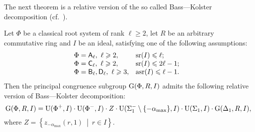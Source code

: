 The next theorem is a relative version of the so called Bass---Kolster decomposition (cf.~\cite[Theorem~2.1]{St78}).
\begin{thm}\label{thm:BassKolster}
Let $\Phi$ be a classical root system of rank $\ell\geqslant2$, let $R$ be an arbitrary commutative ring and $I$ be an ideal, satisfying one of the following assumptions:
\[\begin{array}{l@{\quad}l@{\quad}l@{\quad}c}
\Phi = \rA_\ell,\ \ell\geqslant 2, & \sr(I) \leqslant \ell; \\
\Phi = \rC_\ell,\ \ell\geqslant 2, & \sr(I) \leqslant 2\ell-1; \\
\Phi = \rB_\ell, \rD_\ell,\ \ell\geqslant 3, & \asr(I) \leqslant \ell-1.
\end{array}\]
Then the principal congruence subgroup $\operatorname{G}(\Phi,R,I)$ admits the following relative version of Bass---Kolster decomposition:
\[ \operatorname{G}(\Phi,R,I)=  \operatorname{U}(\Phi^+,I) \cdot \operatorname{U}(\Phi^-,I) \cdot Z \cdot \operatorname{U}(\Sigma_1^-\setminus\{-\alpha_\mathrm{max}\},I) \cdot \operatorname{U}(\Sigma_1,I) \cdot \operatorname{G}(\Delta_1,R,I), \]
where $Z=\left\{ z_{-\alpha_\mathrm{max}}(r,1)\ \middle|\ r\in I \right\}$.
\end{thm}
